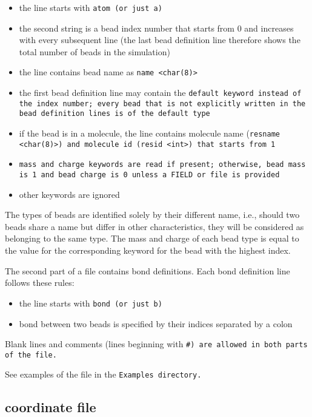 \begin{itemize}[topsep=0pt,itemsep=0pt]
  \item the line starts with \tt{atom} (or just \tt{a})
  \item the second string is a bead index number that starts from 0 and
    increases with every subsequent line (the last bead definition line
    therefore shows the total number of beads in the simulation)
  \item the line contains bead name as \tt{name <char(8)>}
  \item the first bead definition line may contain the \tt{default} keyword instead
    of the index number; every bead that is not explicitly written in the
    bead definition lines is of the default type
  \item if the bead is in a molecule, the line contains molecule name
    (\tt{resname <char(8)>}) and molecule id (\tt{resid <int>})
    that starts from 1
  \item \tt{mass} and \tt{charge} keywords are read if present;
    otherwise, bead mass is 1 and bead charge is 0 unless a \tt{FIELD}
    or \data file is provided
  \item other keywords are ignored
\end{itemize}

The types of beads are identified solely by their different name, i.e.,
should two beads share a name but differ in other characteristics, they
will be considered as belonging to the same type. The mass and charge of
each bead type is equal to the value for the corresponding keyword for the
bead with the highest index.

The second part of a \vsf file contains bond definitions.  Each
bond definition line follows these rules:

\begin{itemize}[topsep=0pt,itemsep=0pt]
  \item the line starts with \tt{bond} (or just \tt{b})
  \item bond between two beads is specified by their indices separated by a
    colon
\end{itemize}

Blank lines and comments (lines beginning with \tt{\#}) are allowed in
both parts of the \vsf file.

See examples of the \vsf file in the \tt{Examples} directory.

\subsection{\vcf coordinate file} \label{ssec:CoordinateVcf}

